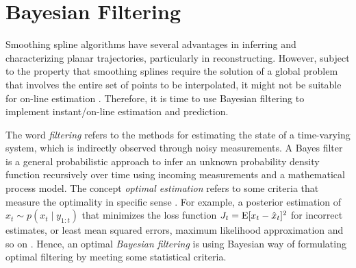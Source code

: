 



%





\section{Bayesian Filtering}

Smoothing spline algorithms have several advantages in inferring and characterizing planar trajectories, particularly in reconstructing. However, subject to the property that smoothing splines require the solution of a global problem that involves the entire set of points to be interpolated, it might not be suitable for on-line estimation \cite{biagiotti2013online}. Therefore, it is time to use Bayesian filtering to implement instant/on-line estimation and prediction. 

The word \textit{filtering} refers to the methods for estimating the state of a time-varying system, which is indirectly observed through noisy measurements. A Bayes filter is a general probabilistic approach to infer an unknown probability density function recursively over time using incoming measurements and a mathematical process model. The concept \textit{optimal estimation} refers to some criteria that measure the optimality in specific sense \cite{anderson1979optimal}. For example, a posterior estimation of $\hat{x}_t\sim p(x_t\mid y_{1:t})$ that minimizes the loss function $J_t=\mathrm{E}\lbrack x_t-\hat{x}_t\rbrack^2$ for incorrect estimates, or least mean squared errors, maximum likelihood approximation and so on \cite{chen2003bayesian} \cite{sarkka2013bayesian}. Hence, an optimal \textit{Bayesian filtering} is using Bayesian way of formulating optimal filtering by meeting some statistical criteria. 

